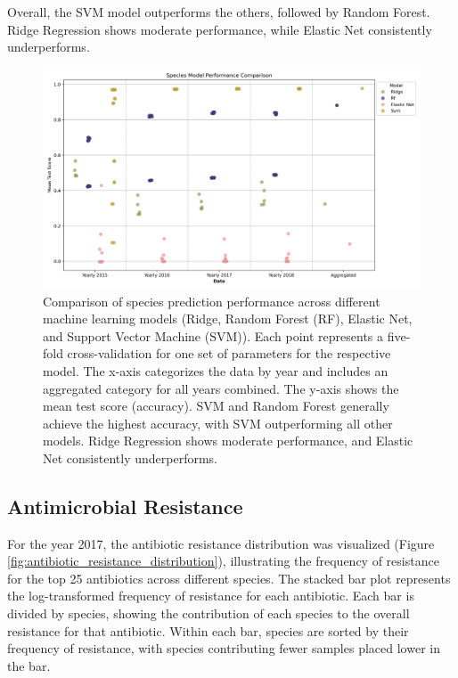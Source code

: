 \documentclass[english,11pt,a4paper,titlepage]{article}
\begin{document}
Overall, the SVM model outperforms the others, followed by Random Forest. Ridge Regression shows moderate performance, while Elastic Net consistently underperforms.

\begin{figure}[h]
	\includegraphics[width=0.9\linewidth]{img/species_model_comparison.png}
	\caption{Comparison of species prediction performance across different machine learning models (Ridge, Random Forest (RF), Elastic Net, and Support Vector Machine (SVM)). Each point represents a five-fold cross-validation for one set of parameters for the respective model. The x-axis categorizes the data by year and includes an aggregated category for all years combined. The y-axis shows the mean test score (accuracy). SVM and Random Forest generally achieve the highest accuracy, with SVM outperforming all other models. Ridge Regression shows moderate performance, and Elastic Net consistently underperforms.}
	\label{fig:model_comparison_species}
\end{figure}

\subsection*{Antimicrobial Resistance}
For the year 2017, the antibiotic resistance distribution was visualized (Figure \ref{fig:antibiotic_resistance_distribution}), illustrating the frequency of resistance for the top 25 antibiotics across different species. The stacked bar plot represents the log-transformed frequency of resistance for each antibiotic. Each bar is divided by species, showing the contribution of each species to the overall resistance for that antibiotic. Within each bar, species are sorted by their frequency of resistance, with species contributing fewer samples placed lower in the bar.
\end{document}
